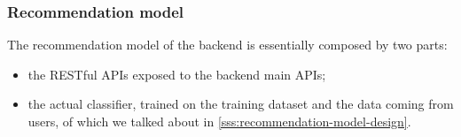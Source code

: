 \documentclass[../../main]{subfiles}
\begin{document}
\subsubsection{Recommendation model}
\label{sss:recommendation-model-development}

The recommendation model of the backend is essentially composed by two parts:
\begin{itemize}
    \item the RESTful APIs exposed to the backend main APIs;
    \item the actual classifier, trained on the training dataset and the data coming from users, of which we talked about in \ref{sss:recommendation-model-design}.
\end{itemize}

\end{document}
